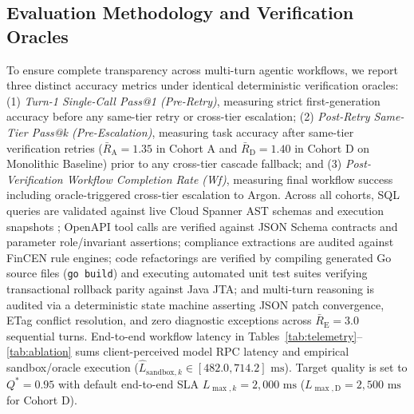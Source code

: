 \documentclass[conference,10pt]{IEEEtran}
\begin{document}
\subsection{Evaluation Methodology and Verification Oracles}
To ensure complete transparency across multi-turn agentic workflows, we report three distinct accuracy metrics under identical deterministic verification oracles: (1) \textit{Turn-1 Single-Call Pass@1 (Pre-Retry)}, measuring strict first-generation accuracy before any same-tier retry or cross-tier escalation; (2) \textit{Post-Retry Same-Tier Pass@k (Pre-Escalation)}, measuring task accuracy after same-tier verification retries ($\bar{R}_{\text{A}}=1.35$ in Cohort A and $\bar{R}_{\text{D}}=1.40$ in Cohort D on Monolithic Baseline) prior to any cross-tier cascade fallback; and (3) \textit{Post-Verification Workflow Completion Rate (Wf)}, measuring final workflow success including oracle-triggered cross-tier escalation to Argon. Across all cohorts, SQL queries are validated against live Cloud Spanner AST schemas and execution snapshots \cite{bird2023}; OpenAPI tool calls are verified against JSON Schema contracts \cite{bray2017rfc8259} and parameter role/invariant assertions; compliance extractions are audited against FinCEN rule engines; code refactorings are verified by compiling generated Go source files (\texttt{go build}) and executing automated unit test suites verifying transactional rollback parity against Java JTA; and multi-turn reasoning is audited via a deterministic state machine asserting JSON patch convergence, ETag conflict resolution, and zero diagnostic exceptions across $\bar{R}_{\text{E}} = 3.0$ sequential turns. End-to-end workflow latency in Tables~\ref{tab:telemetry}--\ref{tab:ablation} sums client-perceived model RPC latency and empirical sandbox/oracle execution ($\hat{L}_{\text{sandbox},k} \in [482.0, 714.2]\text{ ms}$). Target quality is set to $Q^* = 0.95$ with default end-to-end SLA $L_{\max,k} = 2{,}000\text{ ms}$ ($L_{\max,\text{D}} = 2{,}500\text{ ms}$ for Cohort D).
\end{document}
